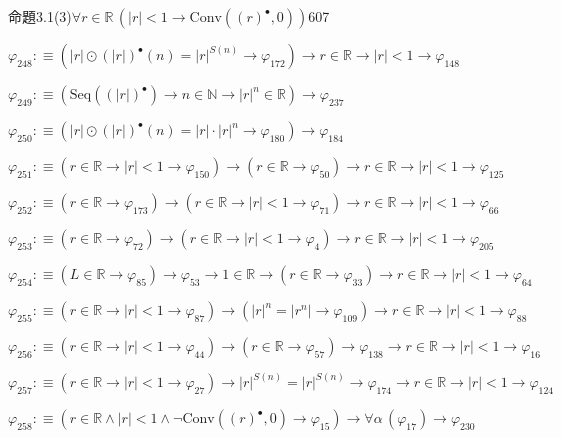 \begin{fullproof}{命題3.1(3)}{$\forall r \in \mathbb{R}\,(\lvert r \rvert < 1 \to \mathrm{Conv}({(r)^{\bullet}},0))$}{607}
\begin{abbrevlist}
\item $\varphi_{248} :\equiv (\lvert r \rvert \odot {(\lvert r \rvert)^{\bullet}}(n) = {{\lvert r \rvert}^{S(n)}} \to \varphi_{172}) \to r \in \mathbb{R} \to \lvert r \rvert < 1 \to \varphi_{148}$
\item $\varphi_{249} :\equiv (\mathrm{Seq}({(\lvert r \rvert)^{\bullet}}) \to n \in \mathbb{N} \to {{\lvert r \rvert}^{n}} \in \mathbb{R}) \to \varphi_{237}$
\item $\varphi_{250} :\equiv (\lvert r \rvert \odot {(\lvert r \rvert)^{\bullet}}(n) = \lvert r \rvert \cdot {{\lvert r \rvert}^{n}} \to \varphi_{180}) \to \varphi_{184}$
\item $\varphi_{251} :\equiv (r \in \mathbb{R} \to \lvert r \rvert < 1 \to \varphi_{150}) \to (r \in \mathbb{R} \to \varphi_{50}) \to r \in \mathbb{R} \to \lvert r \rvert < 1 \to \varphi_{125}$
\item $\varphi_{252} :\equiv (r \in \mathbb{R} \to \varphi_{173}) \to (r \in \mathbb{R} \to \lvert r \rvert < 1 \to \varphi_{71}) \to r \in \mathbb{R} \to \lvert r \rvert < 1 \to \varphi_{66}$
\item $\varphi_{253} :\equiv (r \in \mathbb{R} \to \varphi_{72}) \to (r \in \mathbb{R} \to \lvert r \rvert < 1 \to \varphi_{4}) \to r \in \mathbb{R} \to \lvert r \rvert < 1 \to \varphi_{205}$
\item $\varphi_{254} :\equiv (L \in \mathbb{R} \to \varphi_{85}) \to \varphi_{53} \to 1 \in \mathbb{R} \to (r \in \mathbb{R} \to \varphi_{33}) \to r \in \mathbb{R} \to \lvert r \rvert < 1 \to \varphi_{64}$
\item $\varphi_{255} :\equiv (r \in \mathbb{R} \to \lvert r \rvert < 1 \to \varphi_{87}) \to ({{\lvert r \rvert}^{n}} = \lvert {{r}^{n}} \rvert \to \varphi_{109}) \to r \in \mathbb{R} \to \lvert r \rvert < 1 \to \varphi_{88}$
\item $\varphi_{256} :\equiv (r \in \mathbb{R} \to \lvert r \rvert < 1 \to \varphi_{44}) \to (r \in \mathbb{R} \to \varphi_{57}) \to \varphi_{138} \to r \in \mathbb{R} \to \lvert r \rvert < 1 \to \varphi_{16}$
\item $\varphi_{257} :\equiv (r \in \mathbb{R} \to \lvert r \rvert < 1 \to \varphi_{27}) \to {{\lvert r \rvert}^{S(n)}} = {{\lvert r \rvert}^{S(n)}} \to \varphi_{174} \to r \in \mathbb{R} \to \lvert r \rvert < 1 \to \varphi_{124}$
\item $\varphi_{258} :\equiv (r \in \mathbb{R} \land \lvert r \rvert < 1 \land \neg \mathrm{Conv}({(r)^{\bullet}},0) \to \varphi_{15}) \to \forall \alpha\,(\varphi_{17}) \to \varphi_{230}$

\end{abbrevlist}
\end{fullproof}

